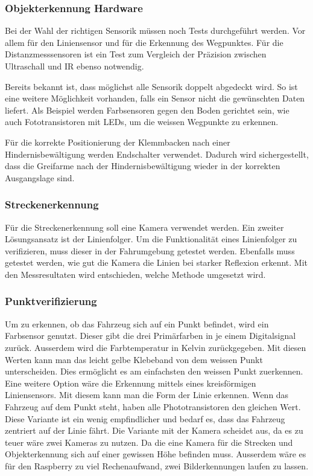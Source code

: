 \documentclass[../main.tex]{subfiles}
\begin{document}
\subsubsection{Objekterkennung Hardware}
 Bei der Wahl der richtigen Sensorik müssen noch Tests durchgeführt werden. Vor allem für den Liniensensor und für die Erkennung des Wegpunktes. Für die Distanzmesssensoren ist ein Test zum Vergleich der Präzision zwischen Ultraschall und IR ebenso notwendig.
 
 Bereits bekannt ist, dass  möglichst alle Sensorik doppelt abgedeckt wird. So ist eine weitere Möglichkeit vorhanden, falls ein Sensor nicht die gewünschten Daten liefert. Als Beispiel werden Farbsensoren gegen den Boden gerichtet sein, wie auch Fototransistoren mit LEDs, um die weissen Wegpunkte zu erkennen.

 Für die korrekte Positionierung der Klemmbacken nach einer Hindernisbewältigung werden Endschalter verwendet. Dadurch wird sichergestellt, dass die Greifarme nach der Hindernisbewältigung wieder in der korrekten Ausgangslage sind.

\subsubsection{Streckenerkennung}
Für die Streckenerkennung soll eine Kamera verwendet werden. Ein zweiter Lösungsansatz ist der Linienfolger. Um die Funktionalität eines Linienfolger zu verifizieren, muss dieser in der Fahrumgebung getestet werden. Ebenfalls muss getestet werden, wie gut die Kamera die Linien bei starker Reflexion erkennt. Mit den Messresultaten wird entschieden, welche Methode umgesetzt wird.


\subsubsection{Punktverifizierung}
Um zu erkennen, ob das Fahrzeug sich auf ein Punkt befindet, wird ein Farbsensor genutzt. Dieser gibt die drei Primärfarben in je einem Digitalsignal zurück. Ausserdem wird die Farbtemperatur in Kelvin zurückgegeben. Mit diesen Werten kann man das leicht gelbe Klebeband von dem weissen Punkt unterscheiden. Dies ermöglicht es am einfachsten den weissen Punkt zuerkennen. Eine weitere Option wäre die Erkennung mittels eines kreisförmigen Liniensensors. Mit diesem kann man die Form der Linie erkennen. Wenn das Fahrzeug auf dem Punkt steht, haben alle Phototransistoren den gleichen Wert. Diese Variante ist ein wenig empfindlicher und bedarf es, dass das Fahrzeug zentriert auf der Linie fährt. Die Variante mit der Kamera scheidet aus, da es zu teuer wäre zwei Kameras zu nutzen. Da die eine Kamera für die Strecken und Objekterkennung sich auf einer gewissen Höhe befinden muss. Ausserdem wäre es für den Raspberry zu viel Rechenaufwand, zwei Bilderkennungen laufen zu lassen.
\end{document}
